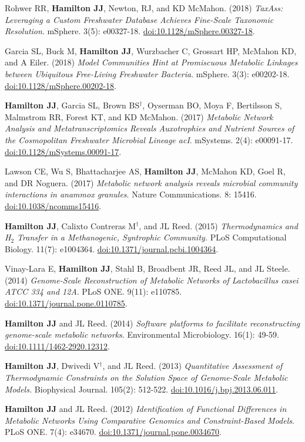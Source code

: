 \documentclass[letterpaper,11pt]{article}
\begin{document}
\begin{etaremune}[itemsep=-2pt]
	\item Rohwer RR, \textbf{Hamilton JJ}, Newton, RJ, and KD McMahon. (2018) \emph{TaxAss: Leveraging a Custom Freshwater Database Achieves Fine-Scale Taxonomic Resolution}. mSphere. 3(5): e00327-18. \href{https://doi.org/10.1128/mSphere.00327-18}{doi:10.1128/mSphere.00327-18}.
	\item Garcia SL, Buck M, \textbf{Hamilton JJ}, Wurzbacher C, Grossart HP, McMahon KD, and A Eiler. (2018) \emph{Model Communities Hint at Promiscuous Metabolic Linkages between Ubiquitous Free-Living Freshwater Bacteria}. mSphere. 3(3): e00202-18. \href{https://doi.org/10.1128/mSphere.00202-18}{doi:10.1128/mSphere.00202-18}.
	\item \textbf{Hamilton JJ}, Garcia SL, Brown BS$^\dagger$, Oyserman BO, Moya F, Bertilsson S, Malmstrom RR, Forest KT, and KD McMahon. (2017) \emph{Metabolic Network Analysis and Metatranscriptomics Reveals Auxotrophies and Nutrient Sources of the Cosmopolitan Freshwater Microbial Lineage acI}. mSystems. 2(4): e00091-17. \href{https://doi.org/10.1128/mSystems.00091-17}{doi:10.1128/mSystems.00091-17}.
	\item Lawson CE, Wu S, Bhattacharjee AS, \textbf{Hamilton JJ}, McMahon KD, Goel R, and DR Noguera. (2017) \emph{Metabolic network analysis reveals microbial community interactions in anammox granules}. Nature Communications. 8: 15416. \href{https://www.nature.com/articles/ncomms15416}{doi:10.1038/ncomms15416}.
	\item \textbf{Hamilton JJ}, Calixto Contreras M$^\dagger$, and JL Reed. (2015) \emph{Thermodynamics and H$_2$ Transfer in a Methanogenic, Syntrophic Community.} PLoS Computational Biology. 11(7): e1004364. \href{http://journals.plos.org/ploscompbiol/article?id=10.1371/journal.pcbi.1004364}{doi:10.1371/journal.pcbi.1004364}.
	\item Vinay-Lara E, \textbf{Hamilton JJ}, Stahl B, Broadbent JR, Reed JL, and JL Steele. (2014) \emph{Genome-Scale Reconstruction of Metabolic Networks of Lactobacillus casei ATCC 334 and 12A}. PLoS ONE. 9(11): e110785. \href{http://journals.plos.org/plosone/article?id=10.1371/journal.pone.0110785}{doi:10.1371/journal.pone.0110785}.
	\item \textbf{Hamilton JJ} and JL Reed. (2014) \emph{Software platforms to facilitate reconstructing genome-scale metabolic networks}. Environmental Microbiology. 16(1): 49-59. \href{http://onlinelibrary.wiley.com/doi/10.1111/1462-2920.12312/abstract}{doi:10.1111/1462-2920.12312}.
	\item \textbf{Hamilton JJ}, Dwivedi V$^\dagger$, and JL Reed. (2013) \emph{Quantitative Assessment of Thermodynamic Constraints on the Solution Space of Genome-Scale Metabolic Models.} Biophysical Journal. 105(2): 512-522. \href{http://www.cell.com/biophysj/abstract/S0006-3495%2813%2900685-1}{doi:10.1016/j.bpj.2013.06.011}.
	\item \textbf{Hamilton JJ} and JL Reed. (2012) \emph{Identification of Functional Differences in Metabolic Networks Using Comparative Genomics and Constraint-Based Models}. PLoS ONE. 7(4): e34670. \href{http://journals.plos.org/plosone/article?id=10.1371/journal.pone.0034670}{doi:10.1371/journal.pone.0034670}.
\end{etaremune}
\end{document}
